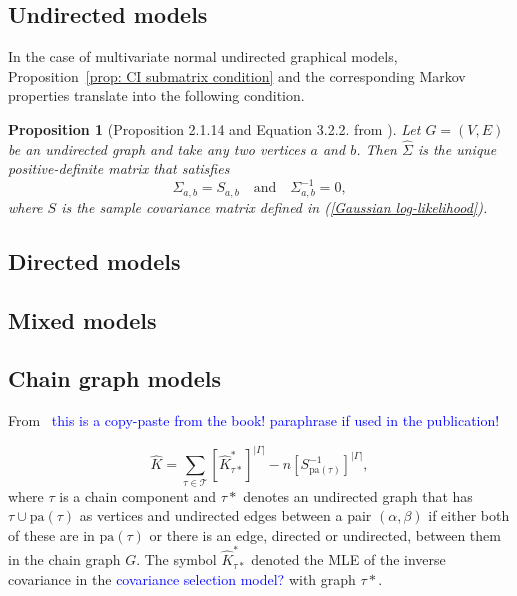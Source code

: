 \documentclass[10pt,a4paper]{article}
\newtheorem{proposition}{Proposition}
\begin{document}
\subsection{Undirected models}
In the case of multivariate normal undirected graphical models, Proposition~\ref{prop: CI submatrix condition} and the corresponding Markov properties translate into the following condition.

\begin{proposition}[Proposition 2.1.14 and Equation 3.2.2. from \cite{drton2008lectures}]
Let $G=(V,E)$ be an undirected graph and take any two vertices $a$ and $b$. Then $\hat{\Sigma}$ is the unique positive-definite matrix that satisfies
\[\Sigma_{a,b}=S_{a,b} \quad \text{and}\quad \Sigma^{-1}_{a,b}=0,\]
where $S$ is the sample covariance matrix defined in (\ref{Gaussian log-likelihood}).

\end{proposition}

\subsection{Directed models}

\subsection{Mixed models}

\subsection{Chain graph models}
From~\cite[Section 5.4.1]{lauritzen1996graphical} \textcolor{blue}{this is a copy-paste from the book! paraphrase if used in the publication!}

\begin{equation}
\hat{K}=\sum\limits_{\tau \in \mathcal{T}}[\hat{K}^*_{\tau*}]^{|\Gamma|}-n[S_{\text{pa}(\tau)}^{-1}]^{|\Gamma|},
\end{equation}
where $\tau$ is a chain component and $\tau*$ denotes an undirected graph that has $\tau \cup \text{pa}(\tau)$ as vertices and undirected edges between a pair $(\alpha,\beta)$ if either both of these are in $\text{pa}(\tau)$ or there is an edge, directed or undirected, between them in the chain graph $G$. The symbol $\hat{K}^*_{\tau*}$ denoted the MLE of the inverse covariance in the \textcolor{blue}{covariance selection model?} with graph $\tau*$.  


\end{document}
